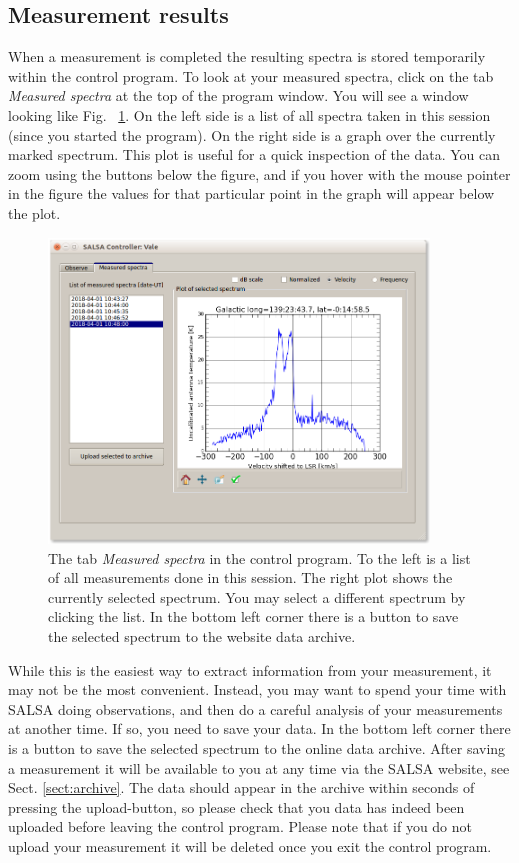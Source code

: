 \subsection{Measurement results}
\label{sect:inspect}
When a measurement is completed the resulting spectra is stored temporarily
within the control program.  To look at your measured spectra, click on the tab
\emph{Measured spectra} at the top of the program window. You will see a window
looking like Fig. ~\ref{fig:controlspectra}. On the left side is a list of all
spectra taken in this session (since you started the program). On the right
side is a graph over the currently marked spectrum. This plot is useful for a
quick inspection of the data. You can zoom using the buttons below the figure,
and if you hover with the mouse pointer in the figure the values for that
particular point in the graph will appear below the plot. 
\begin{figure}[ht]
\begin{center}
\includegraphics[width=0.9\textwidth]{../figures/Controller_spectra.png}
\end{center}
\caption{The tab \emph{Measured spectra} in the control program. To the left is
	a list of all measurements done in this session. The right plot shows the
	currently selected spectrum. You may select a different spectrum by clicking 
	the list. In the bottom left corner there is a button to save the
selected spectrum to the website data archive.}
\label{fig:controlspectra}
\end{figure}
While this is the easiest way to extract information from your measurement, it
may not be the most convenient. Instead, you may want to spend your time with
SALSA doing observations, and then do a careful analysis of your measurements
at another time. If so, you need to save your data.  In the bottom left corner
there is a button to save the selected spectrum to the online data archive.
After saving a measurement it will be available to you at any time via the
SALSA website, see Sect.  \ref{sect:archive}. The data should appear in the archive
within seconds of pressing the upload-button, so please check that you data has indeed been
uploaded before leaving the control program. Please note that if you do not
upload your measurement it will be deleted once you exit the control program.
